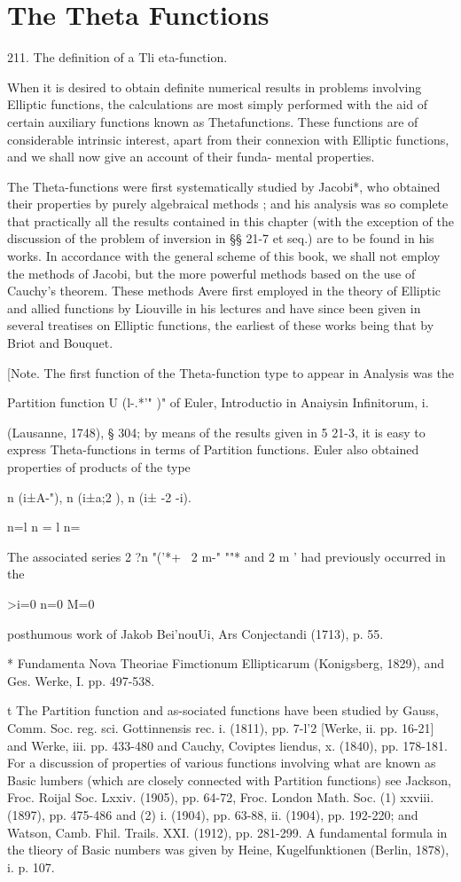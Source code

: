 \chapter{The Theta Functions} 

211. The definition of a Tli eta-function.

When it is desired to obtain definite numerical results in problems
involving Elliptic functions, the calculations are most simply
performed with the aid of certain auxiliary functions known as
Thetafunctions. These functions are of considerable intrinsic
interest, apart from their connexion with Elliptic functions, and we
shall now give an account of their funda- mental properties.

The Theta-functions were first systematically studied by Jacobi*, who
obtained their properties by purely algebraical methods ; and his
analysis was so complete that practically all the results contained in
this chapter (with the exception of the discussion of the problem of
inversion in §§ 21-7 et seq.) are to be found in his works. In
accordance with the general scheme of this book, we shall not employ
the methods of Jacobi, but the more powerful methods based on the use
of Cauchy's theorem. These methods Avere first employed in the theory
of Elliptic and allied functions by Liouville in his lectures and have
since been given in several treatises on Elliptic functions, the
earliest of these works being that by Briot and Bouquet.

[Note. The first function of the Theta-function type to appear in
Analysis was the

Partition function U (l-.*'" )" of Euler, Introductio in Anaiysin
Infinitorum, i.

(Lausanne, 1748), § 304; by means of the results given in 5 21-3, it
is easy to express Theta-functions in terms of Partition functions.
Euler also obtained properties of products of the type

n (i±A-"), n (i±a;2 ), n (i± -2 -i).

n=l n = l n=\

The associated series 2 ?n "('*+ \ 2 m-" ""* and 2 m ' had previously
occurred in the

>i=0 n=0 M=0

posthumous work of Jakob Bei'nouUi, Ars Conjectandi (1713), p. 55.

* Fundamenta Nova Theoriae Fimctionum Ellipticarum (Konigsberg, 1829),
and Ges. Werke, I. pp. 497-538.

t The Partition function and as-sociated functions have been studied
by Gauss, Comm. Soc. reg. sci. Gottinnensis rec. i. (1811), pp. 7-l'2
[Werke, ii. pp. 16-21] and Werke, iii. pp. 433-480 and Cauchy,
Coviptes liendus, x. (1840), pp. 178-181. For a discussion of
properties of various functions involving what are known as Basic
lumbers (which are closely connected with Partition functions) see
Jackson, Froc. Roijal Soc. Lxxiv. (1905), pp. 64-72, Froc. London
Math. Soc. (1) xxviii. (1897), pp. 475-486 and (2) i. (1904), pp.
63-88, ii. (1904), pp. 192-220; and Watson, Camb. Fhil. Trails. XXI.
(1912), pp. 281-299. A fundamental formula in the tlieory of Basic
numbers was given by Heine, Kugelfunktionen (Berlin, 1878), i. p. 107.


